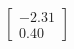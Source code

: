 \documentclass[preview]{standalone}
\begin{document}
\begin{align*}
\begin{bmatrix} -2.31 \\ 0.40 \end{bmatrix}
\end{align*}
\end{document}
